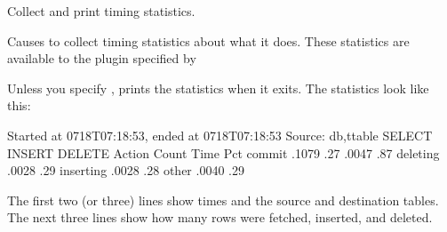 \documentclass[letterpaper,10pt,english]{sphinxmanual}
\begin{document}

\begin{fulllineitems}
\label{\detokenize{mariadb-archiver:cmdoption-mariadb-archiver-statistics}}
\sphinxAtStartPar
Collect and print timing statistics.

\sphinxAtStartPar
Causes  to collect timing statistics about what it does.  These
statistics are available to the plugin specified by {\hyperref[\detokenize{mariadb-archiver:cmdoption-mariadb-archiver-plugin}]{}}

\sphinxAtStartPar
Unless you specify {\hyperref[\detokenize{mariadb-archiver:cmdoption-mariadb-archiver-quiet}]{}},  prints the statistics when it
exits.  The statistics look like this:

\begin{sphinxVerbatim}[commandchars=\\\{\}]
Started at \PYGZhy{}07\PYGZhy{}18T07:18:53, ended at \PYGZhy{}07\PYGZhy{}18T07:18:53
Source: db,ttable
SELECT 
INSERT 
DELETE 
Action         Count       Time        Pct
commit                 .1079      .27
                  .0047       .87
deleting                .0028       .29
inserting               .0028       .28
other                   .0040       .29
\end{sphinxVerbatim}

\sphinxAtStartPar
The first two (or three) lines show times and the source and destination tables.
The next three lines show how many rows were fetched, inserted, and deleted.


\end{fulllineitems}
\end{document}
